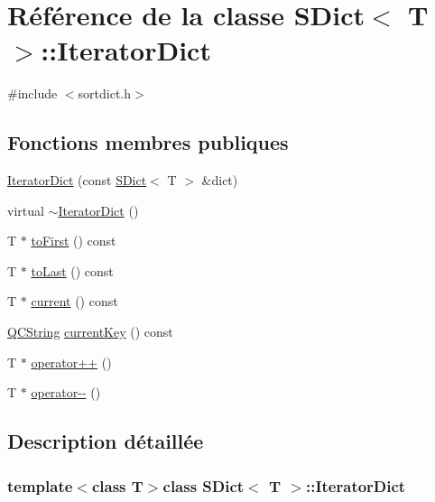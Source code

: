 \hypertarget{class_s_dict_1_1_iterator_dict}{}\section{Référence de la classe S\+Dict$<$ T $>$\+:\+:Iterator\+Dict}
\label{class_s_dict_1_1_iterator_dict}


{\ttfamily \#include $<$sortdict.\+h$>$}

\subsection*{Fonctions membres publiques}
\begin{DoxyCompactItemize}
\item 
\hyperlink{class_s_dict_1_1_iterator_dict_a23920bdd95642c98bf29aaafbb55f949}{Iterator\+Dict} (const \hyperlink{class_s_dict}{S\+Dict}$<$ T $>$ \&dict)
\item 
virtual \hyperlink{class_s_dict_1_1_iterator_dict_a38499552aca040055682862929ab4477}{$\sim$\+Iterator\+Dict} ()
\item 
T $\ast$ \hyperlink{class_s_dict_1_1_iterator_dict_ab5f51a562a5331167bebc243e9a51e6f}{to\+First} () const 
\item 
T $\ast$ \hyperlink{class_s_dict_1_1_iterator_dict_aa4fd8b92e85afdf94f374bfce79394da}{to\+Last} () const 
\item 
T $\ast$ \hyperlink{class_s_dict_1_1_iterator_dict_adb3a0dbfa431ecf89e53a745454a10e9}{current} () const 
\item 
\hyperlink{class_q_c_string}{Q\+C\+String} \hyperlink{class_s_dict_1_1_iterator_dict_a239fb56b93c28eabbdf283be4438f675}{current\+Key} () const 
\item 
T $\ast$ \hyperlink{class_s_dict_1_1_iterator_dict_ae2fbd7c81e8c8f04d6df63c112c0514e}{operator++} ()
\item 
T $\ast$ \hyperlink{class_s_dict_1_1_iterator_dict_a842928fda118cdd32174fa614e4adfc7}{operator-\/-\/} ()
\end{DoxyCompactItemize}


\subsection{Description détaillée}
\subsubsection*{template$<$class T$>$class S\+Dict$<$ T $>$\+::\+Iterator\+Dict}

